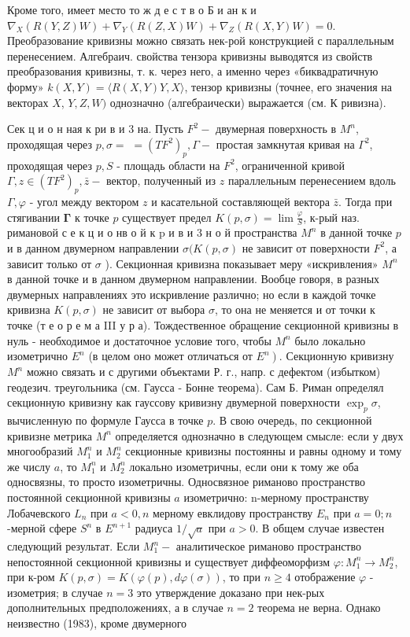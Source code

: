 \documentclass[10pt]{article}
\begin{document}
Кроме того, имеет место то ж д е с т в о Б и ан к и $\nabla_{X}(R(Y, Z) W)+\nabla_{Y}(R(Z, X) W)+\nabla_{Z}(R(X, Y) W)=0$. Преобразование кривизны можно связать нек-рой конструкцией с параллельным перенесением. Алгебраич. свойства тензора кривизны выводятся из свойств преобразования кривизны, т. к. через него, а именно через «биквадратичную форму» $k(X, Y)=\langle R(X, Y) Y, X\rangle$, тензор кривизны (точнее, его значения на векторах $X$, $Y, Z, W)$ однозначно (алгебраически) выражается (см. К ривизна).



Сек ц и о н ная к ри в и 3 на. Пусть $F^{2}-$ двумерная поверхность в $M^{n}$, проходящая через $p, \sigma=$ $=\left(T F^{2}\right)_{p}, \Gamma-$ простая замкнутая кривая на $\Gamma^{2}$, проходящая через $p, S$ - площадь области на $F^{2}$, ограниченной кривой $\Gamma, z \in\left(T F^{2}\right)_{p}, \bar{z}-$ вектор, полученный из $z$ параллельным перенесением вдоль $\Gamma, \varphi$ - угол между вектором $z$ и касательной составляющей вектора $\bar{z}$. Тогда при стягивании $\boldsymbol{\Gamma}$ к точке $p$ существует предел $K(p, \sigma)=\lim \frac{\varphi}{S}$, к-рый наз. римановой с е к ц и о нв $о$ й к $\mathrm{p}$ и в и 3 н о й пространства $M^{n}$ в данной точке $p$ и в данном двумерном направлении $\sigma(K(p, \sigma)$ не зависит от поверхности $F^{2}$, а зависит только от $\sigma$ ). Секционная кривизна показывает меру «искривления» $M^{n}$ в данной точке и в данном двумерном направлении. Вообце говоря, в разных двумерных направлениях это искривление различно; но если в каждой точке кривизна $K(p, \sigma)$ не зависит от выбора $\sigma$, то она не меняется и от точки к точке (т е о р е м а III у р а). Тождественное обращение секционной кривизны в нуль - необходимое и достаточное условие того, чтобы $M^{n}$ было локально изометрично $E^{n}$ (в целом оно может отличаться от $\left.E^{n}\right)$. Секционную кривизну $M^{n}$ можно связать и с другими объектами Р. г., напр. с дефектом (избытком) геодезич. треугольника (см. Гаусса - Бонне теорема). Сам Б. Риман определял секционную кривизну как гауссову кривизну двумерной поверхности $\exp _{p} \sigma$, вычисленную по формуле Гаусса в точке $p$. В свою очередь, по секционной кривизне метрика $M^{n}$ определяется однозначно в следующем смысле: если у двух многообразий $M_{1}^{n}$ и $M_{2}^{n}$ секционные кривизны постоянны и равны одному и тому же числу $a$, то $M_{1}^{n}$ и $M_{2}^{n}$ локально изометричны, если они к тому же оба односвязны, то просто изометричны. Односвязное риманово пространство постоянной секционной кривизны $a$ изометрично: n-мерному пространству Лобачевского $L_{n}$ при $a<0, n$ мерному евклидову пространству $E_{n}$ при $a=0 ; n$-мерной сфере $S^{n}$ в $E^{n+1}$ радиуса $1 / \sqrt{a}$ при $a>0$. В общем случае известен следующий результат. Если $M_{1}^{n}-$ аналитическое риманово пространство непостоянной секционной кривизны и существует диффеоморфизм $\varphi: M_{1}^{n} \rightarrow M_{2}^{n}$, при к-ром $K(p, \sigma)=K(\varphi(p), d \varphi(\sigma))$, то при $n \geqslant 4$ отображение $\varphi$ - изометрия; в случае $n=3$ это утверждение доказано при нек-рых дополнительных предположениях, а в случае $n=2$ теорема не верна. Однако неизвестно (1983), кроме двумерного 
\end{document}
